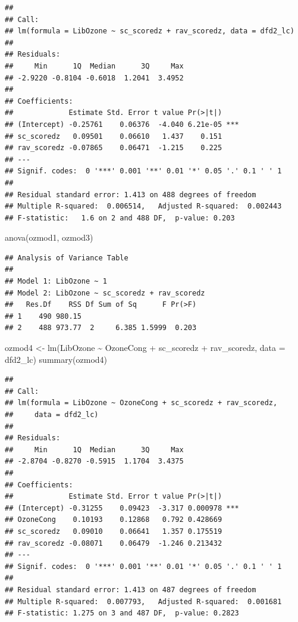 \documentclass[
]{article}
\newenvironment{Shaded}{\begin{snugshade}}{\end{snugshade}}
\newcommand{\AttributeTok}[1]{\textcolor[rgb]{0.77,0.63,0.00}{#1}}
\newcommand{\FunctionTok}[1]{\textcolor[rgb]{0.00,0.00,0.00}{#1}}
\newcommand{\NormalTok}[1]{#1}
\newcommand{\OtherTok}[1]{\textcolor[rgb]{0.56,0.35,0.01}{#1}}
\newcommand{\SpecialCharTok}[1]{\textcolor[rgb]{0.00,0.00,0.00}{#1}}
\begin{document}
\begin{verbatim}
## 
## Call:
## lm(formula = LibOzone ~ sc_scoredz + rav_scoredz, data = dfd2_lc)
## 
## Residuals:
##     Min      1Q  Median      3Q     Max 
## -2.9220 -0.8104 -0.6018  1.2041  3.4952 
## 
## Coefficients:
##             Estimate Std. Error t value Pr(>|t|)    
## (Intercept) -0.25761    0.06376  -4.040 6.21e-05 ***
## sc_scoredz   0.09501    0.06610   1.437    0.151    
## rav_scoredz -0.07865    0.06471  -1.215    0.225    
## ---
## Signif. codes:  0 '***' 0.001 '**' 0.01 '*' 0.05 '.' 0.1 ' ' 1
## 
## Residual standard error: 1.413 on 488 degrees of freedom
## Multiple R-squared:  0.006514,   Adjusted R-squared:  0.002443 
## F-statistic:   1.6 on 2 and 488 DF,  p-value: 0.203
\end{verbatim}

\begin{Shaded}
\begin{Highlighting}[]
\FunctionTok{anova}\NormalTok{(ozmod1, ozmod3)}
\end{Highlighting}
\end{Shaded}

\begin{verbatim}
## Analysis of Variance Table
## 
## Model 1: LibOzone ~ 1
## Model 2: LibOzone ~ sc_scoredz + rav_scoredz
##   Res.Df    RSS Df Sum of Sq      F Pr(>F)
## 1    490 980.15                           
## 2    488 973.77  2     6.385 1.5999  0.203
\end{verbatim}

\begin{Shaded}
\begin{Highlighting}[]
\NormalTok{ozmod4 }\OtherTok{\textless{}{-}} \FunctionTok{lm}\NormalTok{(LibOzone }\SpecialCharTok{\textasciitilde{}}\NormalTok{ OzoneCong }\SpecialCharTok{+}\NormalTok{ sc\_scoredz }\SpecialCharTok{+}\NormalTok{ rav\_scoredz, }\AttributeTok{data =}\NormalTok{ dfd2\_lc)}
\FunctionTok{summary}\NormalTok{(ozmod4)}
\end{Highlighting}
\end{Shaded}

\begin{verbatim}
## 
## Call:
## lm(formula = LibOzone ~ OzoneCong + sc_scoredz + rav_scoredz, 
##     data = dfd2_lc)
## 
## Residuals:
##     Min      1Q  Median      3Q     Max 
## -2.8704 -0.8270 -0.5915  1.1704  3.4375 
## 
## Coefficients:
##             Estimate Std. Error t value Pr(>|t|)    
## (Intercept) -0.31255    0.09423  -3.317 0.000978 ***
## OzoneCong    0.10193    0.12868   0.792 0.428669    
## sc_scoredz   0.09010    0.06641   1.357 0.175519    
## rav_scoredz -0.08071    0.06479  -1.246 0.213432    
## ---
## Signif. codes:  0 '***' 0.001 '**' 0.01 '*' 0.05 '.' 0.1 ' ' 1
## 
## Residual standard error: 1.413 on 487 degrees of freedom
## Multiple R-squared:  0.007793,   Adjusted R-squared:  0.001681 
## F-statistic: 1.275 on 3 and 487 DF,  p-value: 0.2823
\end{verbatim}
\end{document}
